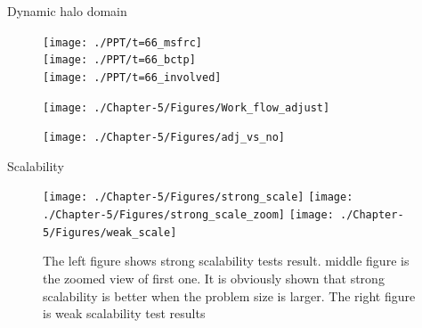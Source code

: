 \documentclass{beamer}
\begin{document}
\begin{frame}{Dynamic halo domain}
\begin{minipage}{0.285 \textwidth}
\begin{figure}
\flushleft
\texttt{[image: ./PPT/t=66\_msfrc]}
\\
\flushleft
\texttt{[image: ./PPT/t=66\_bctp]}
\\
\flushleft
\texttt{[image: ./PPT/t=66\_involved]}
\end{figure}
\end{minipage}
\hfill
\begin{minipage}{0.34\textwidth}
\begin{figure}
\texttt{[image: ./Chapter-5/Figures/Work\_flow\_adjust]}
\end{figure}
\end{minipage}
\hfill
\begin{minipage}{0.355 \textwidth}
\begin{scriptsize}
\linespread{1.0}{
SWCH: switch pressure ghost particles to real. ADPP: add new pressure ghost particles. ADWP: add wall ghost particles. SCN: scann the outmost layer of the domain}
\end{scriptsize}
\center
{}
\begin{figure}
\texttt{[image: ./Chapter-5/Figures/adj\_vs\_no]}
\end{figure}
\end{minipage}
\end{frame}

\begin{frame}{Scalability}
\begin{figure}
\flushleft
\texttt{[image: ./Chapter-5/Figures/strong\_scale]}
\hfill
\texttt{[image: ./Chapter-5/Figures/strong\_scale\_zoom]}
\hfill
\texttt{[image: ./Chapter-5/Figures/weak\_scale]}
\caption{The left figure shows strong scalability tests result. middle figure is the zoomed view of first one. It is obviously shown that strong scalability is better when the problem size is larger. The right figure is weak scalability test results}
\label{fig:2cases_efficiency}
\end{figure}
\end{frame}
\end{document}

